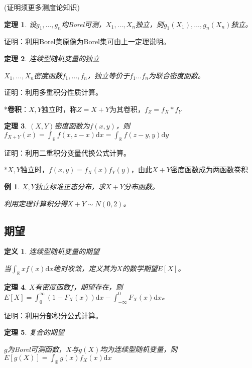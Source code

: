 \documentclass[a4paper,UTF8,fontset=windows]{ctexart}
\newtheorem{thm}{定理}[section]
\newtheorem{exmp}{例}[section]
\newtheorem{defi}{定义}[section]
\begin{document}
(证明须更多测度论知识)

\begin{thm}
设$g_1,\dots,g_n$均Borel可测，$X_1,\dots,X_n$独立，则$g_1(X_1),\dots,g_n(X_n)$独立。
\end{thm}

证明：利用Borel集原像为Borel集可由上一定理说明。

\begin{thm} 连续型随机变量的独立

$X_1,\dots,X_n$密度函数$f_1,\dots,f_n$，独立等价于$f_1\dots f_n$为联合密度函数。
\end{thm}

证明：利用多重积分性质计算。

*\textbf{卷积}：$X,Y$独立时，称$Z=X+Y$为其卷积，$f_Z=f_X*f_Y$

\begin{thm}
$(X,Y)$密度函数为$f(x,y)$，则$f_{X+Y}(x)=\int_\mathbb{R}f(x,z-x)\mathrm{d}x=\int_\mathbb{R}f(z-y,y)\mathrm{d}y$
\end{thm}

证明：利用二重积分变量代换公式计算。

*$X,Y$独立时，$f(x,y)=f_X(x)f_Y(y)$，由此$X+Y$密度函数成为两函数卷积

\begin{exmp} $X,Y$独立标准正态分布，求$X+Y$分布函数。

利用定理计算积分得$X+Y\sim N(0,2)$。
\end{exmp}

\subsection{期望}
\begin{defi} 连续型随机变量的期望

当$\int_\mathbb{R}xf(x)\mathrm{d}x$绝对收敛，定义其为$X$的数学期望$E[X]$。
\end{defi}

\begin{thm}
$X$有密度函数$f$，期望存在，则$E[X]=\int_0^\infty(1-F_X(x))\mathrm{d}x-\int_{-\infty}^0F_X(x)\mathrm{d}x$。
\end{thm}

证明：利用分部积分公式计算。

\begin{thm} 复合的期望
	
$g$为Borel可测函数，$X$与$g(X)$均为连续型随机变量，则$E[g(X)]=\int_\mathbb{R}g(x)f_X(x)\mathrm{d}x$
\end{thm}
\end{document}
